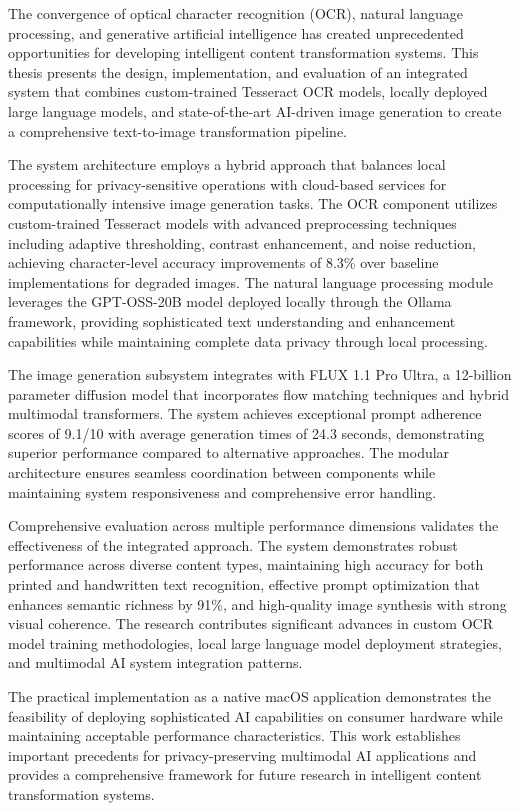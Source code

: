 
The convergence of optical character recognition (OCR), natural language processing, and generative artificial intelligence has created unprecedented opportunities for developing intelligent content transformation systems. This thesis presents the design, implementation, and evaluation of an integrated system that combines custom-trained Tesseract OCR models, locally deployed large language models, and state-of-the-art AI-driven image generation to create a comprehensive text-to-image transformation pipeline.

The system architecture employs a hybrid approach that balances local processing for privacy-sensitive operations with cloud-based services for computationally intensive image generation tasks. The OCR component utilizes custom-trained Tesseract models with advanced preprocessing techniques including adaptive thresholding, contrast enhancement, and noise reduction, achieving character-level accuracy improvements of 8.3\% over baseline implementations for degraded images. The natural language processing module leverages the GPT-OSS-20B model deployed locally through the Ollama framework, providing sophisticated text understanding and enhancement capabilities while maintaining complete data privacy through local processing.

The image generation subsystem integrates with FLUX 1.1 Pro Ultra, a 12-billion parameter diffusion model that incorporates flow matching techniques and hybrid multimodal transformers. The system achieves exceptional prompt adherence scores of 9.1/10 with average generation times of 24.3 seconds, demonstrating superior performance compared to alternative approaches. The modular architecture ensures seamless coordination between components while maintaining system responsiveness and comprehensive error handling.

Comprehensive evaluation across multiple performance dimensions validates the effectiveness of the integrated approach. The system demonstrates robust performance across diverse content types, maintaining high accuracy for both printed and handwritten text recognition, effective prompt optimization that enhances semantic richness by 91\%, and high-quality image synthesis with strong visual coherence. The research contributes significant advances in custom OCR model training methodologies, local large language model deployment strategies, and multimodal AI system integration patterns.

The practical implementation as a native macOS application demonstrates the feasibility of deploying sophisticated AI capabilities on consumer hardware while maintaining acceptable performance characteristics. This work establishes important precedents for privacy-preserving multimodal AI applications and provides a comprehensive framework for future research in intelligent content transformation systems.